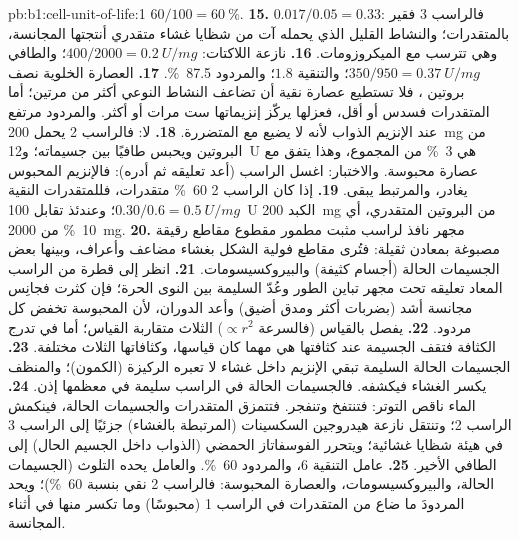 \begin{solution}{pb:b1:cell-unit-of-life:1}
$60/100 =
\qty{60}{\%}$.
\textbf{15.} $0.017/0.05 = 0.33$: فالراسب 3 فقير بالمتقدرات؛ والنشاط القليل الذي يحمله آت من شظايا غشاء متقدري أنتجتها المجانسة، وهي تترسب مع الميكروزومات.
\textbf{16.} نازعة اللاكتات:  $400/2000 = \qty{0.2}{U/mg}$؛
والطافي $350/950 = \qty{0.37}{U/mg}$؛ والتنقية $1.8$؛ والمردود
\qty{87.5}{\%}.
\textbf{17.} العصارة الخلوية نصف بروتين ، فلا تستطيع عصارة
نقية أن تضاعف النشاط النوعي أكثر من مرتين؛ أما المتقدرات فسدس أو أقل،
فعزلها يركّز إنزيماتها ست مرات أو أكثر. والمردود مرتفع عند الإنزيم
الذواب لأنه لا يضيع مع  المتضررة.
\textbf{18.} لا: فالراسب 2 يحمل \qty{200}{mg} من البروتين ويحبس
طافيًا بين جسيماته؛ و\qty{12}{U} هي \qty{3}{\%} من المجموع، وهذا
يتفق مع عصارة محبوسة. والاختبار: اغسل الراسب (أعد تعليقه ثم أدره):
فالإنزيم المحبوس يغادر، والمرتبط يبقى.
\textbf{19.} إذا كان الراسب 2 \qty{60}{\%} متقدرات، فللمتقدرات
النقية $0.30/0.6 = \qty{0.5}{U/mg}$؛ وعندئذ تقابل \qty{100}{U}
الكبد \qty{200}{mg} من البروتين المتقدري، أي \qty{10}{\%} من
\qty{2000}{mg}.
\textbf{20.} مجهر نافذ لراسب مثبت مطمور مقطوع مقاطع رقيقة مصبوغة
بمعادن ثقيلة: فتُرى مقاطع فولية الشكل بغشاء مضاعف وأعراف، وبينها بعض
الجسيمات الحالة (أجسام كثيفة) والبيروكسيسومات.
\textbf{21.} انظر إلى قطرة من الراسب المعاد تعليقه تحت مجهر تباين الطور وعُدّ  السليمة بين النوى الحرة؛ فإن كثرت فجانِس مجانسة أشد (بضربات أكثر ومدق أضيق) وأعد الدوران، لأن  المحبوسة تخفض كل مردود.
\textbf{22.}  يفصل بالقياس (فالسرعة
$\propto r^2$)  الثلاث متقاربة القياس؛ أما في تدرج الكثافة
فتقف الجسيمة عند كثافتها هي مهما كان قياسها، وكثافاتها الثلاث
مختلفة.
\textbf{23.} الجسيمات الحالة السليمة تبقي الإنزيم داخل غشاء لا تعبره
الركيزة (الكمون)؛ والمنظف يكسر الغشاء فيكشفه. فالجسيمات الحالة في
الراسب سليمة في معظمها إذن.
\textbf{24.} الماء ناقص التوتر: فتنتفخ  وتنفجر. فتتمزق
المتقدرات والجسيمات الحالة، فينكمش الراسب 2؛ وتنتقل نازعة هيدروجين
السكسينات (المرتبطة بالغشاء) جزئيًا إلى الراسب 3 في هيئة شظايا
غشائية؛ ويتحرر الفوسفاتاز الحمضي (الذواب داخل الجسيم الحال) إلى
الطافي الأخير.
\textbf{25.} عامل التنقية $6$، والمردود \qty{60}{\%}. والعامل يحده
التلوث (الجسيمات الحالة، والبيروكسيسومات، والعصارة المحبوسة: فالراسب
2 نقي بنسبة \qty{60}{\%})؛ ويحد المردودَ ما ضاع من المتقدرات في
الراسب 1 (محبوسًا) وما تكسر منها في أثناء المجانسة.
\end{solution}
